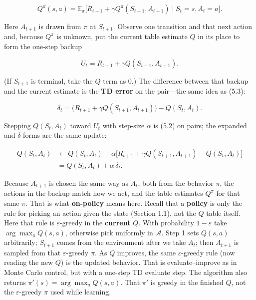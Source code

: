 \begin{equation}
Q^\pi(s,a)
=
\mathbb{E}_\pi\bigl[R_{t+1}+\gamma Q^\pi(S_{t+1},A_{t+1})\mid S_t=s,A_t=a\bigr].
\tag{6.1}
\end{equation}

Here $A_{t+1}$ is drawn from $\pi$ at $S_{t+1}$. Observe one transition and that next action and, because $Q^\pi$ is unknown, put the current table estimate $Q$ in its place to form the one-step backup

\[
U_t=R_{t+1}+\gamma Q(S_{t+1},A_{t+1}).
\]

(If $S_{t+1}$ is terminal, take the $Q$ term as $0$.) The difference between that backup and the current estimate is the \textbf{TD error} on the pair---the same idea as (5.3):

\begin{equation}
\delta_t
=
\bigl(R_{t+1}+\gamma Q(S_{t+1},A_{t+1})\bigr) - Q(S_t,A_t).
\tag{6.2}
\end{equation}

Stepping $Q(S_t,A_t)$ toward $U_t$ with step-size $\alpha$ is (5.2) on pairs; the expanded and $\delta$ forms are the same update:

\begin{equation}
\begin{aligned}
Q(S_t,A_t)
&\leftarrow
Q(S_t,A_t)
+
\alpha\bigl[R_{t+1}+\gamma Q(S_{t+1},A_{t+1})-Q(S_t,A_t)\bigr]
\\
&=
Q(S_t,A_t)+\alpha\,\delta_t.
\end{aligned}
\tag{6.3}
\end{equation}

Because $A_{t+1}$ is chosen the same way as $A_t$, both from the behavior $\pi$, the actions in the backup match how we act, and the table estimates $Q^\pi$ for that same $\pi$. That is what \textbf{on-policy} means here. Recall that a \textbf{policy} is only the rule for picking an action given the state (Section 1.1), not the $Q$ table itself. Here that rule is $\varepsilon$-greedy in the \textbf{current} $Q$. With probability $1-\varepsilon$ take $\arg\max_a Q(s,a)$, otherwise pick uniformly in $\mathcal{A}$. Step 1 sets $Q(s,a)$ arbitrarily; $S_{t+1}$ comes from the environment after we take $A_t$; then $A_{t+1}$ is sampled from that $\varepsilon$-greedy $\pi$. As $Q$ improves, the same $\varepsilon$-greedy rule (now reading the new $Q$) is the updated behavior. That is evaluate--improve as in Monte Carlo control, but with a one-step TD evaluate step. The algorithm also returns $\pi'(s)=\arg\max_a Q(s,a)$. That $\pi'$ is greedy in the finished $Q$, not the $\varepsilon$-greedy $\pi$ used while learning.

